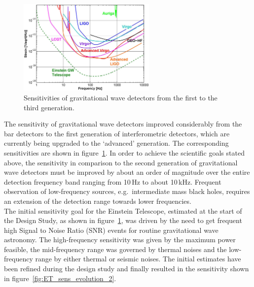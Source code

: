 \begin{figure}
\vskip -0.4cm
	\centering
		\includegraphics[width=0.6\textwidth]{Sec_Introduction/3gen_sens.png}
	\caption{Sensitivities of gravitational wave detectors from the first to the third generation.}
	\label{fig:GW_sens_evolution}
\end{figure}
The sensitivity of gravitational wave detectors improved considerably from 
the bar detectors to the first generation of interferometric detectors, which are 
currently being upgraded to the `advanced' generation. The corresponding 
sensitivities are shown in figure~\ref{fig:GW_sens_evolution}. 
In order to achieve the scientific goals stated above, the sensitivity in comparison 
to the second generation of gravitational wave detectors must be improved 
by about an order of magnitude over the entire detection frequency band ranging 
from 10\,Hz to about 10\,kHz. Frequent observation of low-frequency sources, 
e.g.\ intermediate mass black holes, requires an extension of the detection 
range towards lower frequencies. \\
The initial sensitivity goal for the Einstein Telescope, estimated at the start of 
the Design Study, as shown in figure~\ref{fig:GW_sens_evolution}, was driven 
by the need to get frequent high Signal to Noise Ratio (SNR) events for routine 
gravitational wave astronomy. The high-frequency sensitivity was given by the 
maximum power feasible, the mid-frequency range was governed by thermal 
noises and the low-frequency range by either thermal or seismic noises. The 
initial estimates have been refined during the design study and finally resulted 
in the sensitivity shown in figure~\ref{fig:ET_sens_evolution_2}.\\
